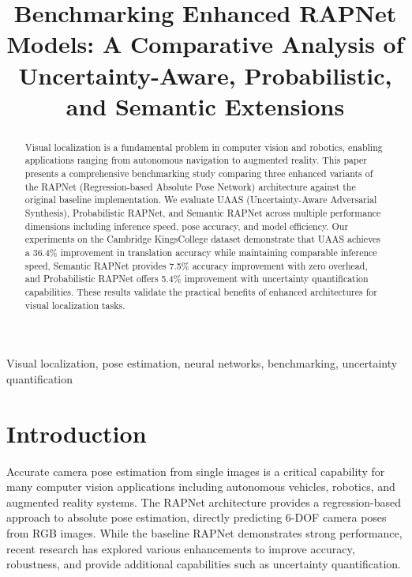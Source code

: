 \documentclass[conference]{IEEEtran}
\begin{document}
\title{Benchmarking Enhanced RAPNet Models: A Comparative Analysis of Uncertainty-Aware, Probabilistic, and Semantic Extensions}

\author{
}

\maketitle

\begin{abstract}
Visual localization is a fundamental problem in computer vision and robotics, enabling applications ranging from autonomous navigation to augmented reality. This paper presents a comprehensive benchmarking study comparing three enhanced variants of the RAPNet (Regression-based Absolute Pose Network) architecture against the original baseline implementation. We evaluate UAAS (Uncertainty-Aware Adversarial Synthesis), Probabilistic RAPNet, and Semantic RAPNet across multiple performance dimensions including inference speed, pose accuracy, and model efficiency. Our experiments on the Cambridge KingsCollege dataset demonstrate that UAAS achieves a 36.4\% improvement in translation accuracy while maintaining comparable inference speed, Semantic RAPNet provides 7.5\% accuracy improvement with zero overhead, and Probabilistic RAPNet offers 5.4\% improvement with uncertainty quantification capabilities. These results validate the practical benefits of enhanced architectures for visual localization tasks.
\end{abstract}

\begin{IEEEkeywords}
Visual localization, pose estimation, neural networks, benchmarking, uncertainty quantification
\end{IEEEkeywords}

\section{Introduction}

Accurate camera pose estimation from single images is a critical capability for many computer vision applications including autonomous vehicles, robotics, and augmented reality systems. The RAPNet architecture \cite{rapnet} provides a regression-based approach to absolute pose estimation, directly predicting 6-DOF camera poses from RGB images. While the baseline RAPNet demonstrates strong performance, recent research has explored various enhancements to improve accuracy, robustness, and provide additional capabilities such as uncertainty quantification.
\end{document}
